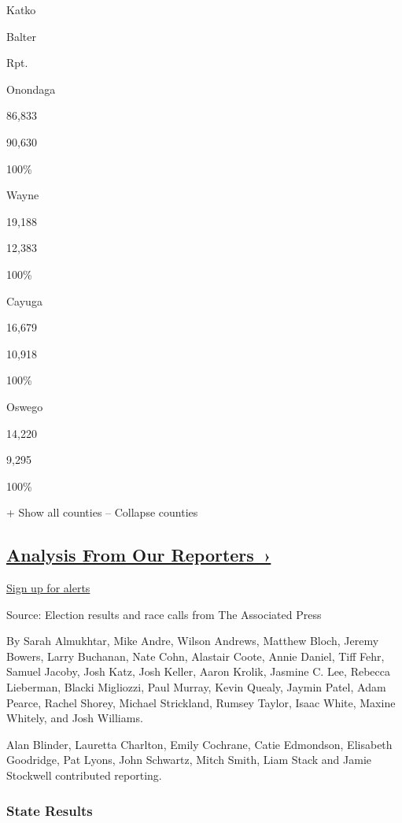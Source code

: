 Katko

Balter

Rpt.

Onondaga

86,833

90,630

100\%

Wayne

19,188

12,383

100\%

Cayuga

16,679

10,918

100\%

Oswego

14,220

9,295

100\%

+ Show all counties -- Collapse counties

\hypertarget{analysis-from-our-reporters-}{%
\subsection{\texorpdfstring{\href{https://www.nytimes3xbfgragh.onion/interactive/2018/11/06/us/elections/live-midterm-election-analysis-updates.html}{Analysis
From Our
Reporters~›}}{Analysis From Our Reporters~›}}\label{analysis-from-our-reporters-}}

\protect\hyperlink{}{Sign up for alerts}

Source: Election results and race calls from The Associated Press

By Sarah Almukhtar, Mike Andre, Wilson Andrews, Matthew Bloch, Jeremy
Bowers, Larry Buchanan, Nate Cohn, Alastair Coote, Annie Daniel, Tiff
Fehr, Samuel Jacoby, Josh Katz, Josh Keller, Aaron Krolik, Jasmine C.
Lee, Rebecca Lieberman, Blacki Migliozzi, Paul Murray, Kevin Quealy,
Jaymin Patel, Adam Pearce, Rachel Shorey, Michael Strickland, Rumsey
Taylor, Isaac White, Maxine Whitely, and Josh Williams.

Alan Blinder, Lauretta Charlton, Emily Cochrane, Catie Edmondson,
Elisabeth Goodridge, Pat Lyons, John Schwartz, Mitch Smith, Liam Stack
and Jamie Stockwell contributed reporting.

\hypertarget{state-results}{%
\subsubsection{State Results}\label{state-results}}

